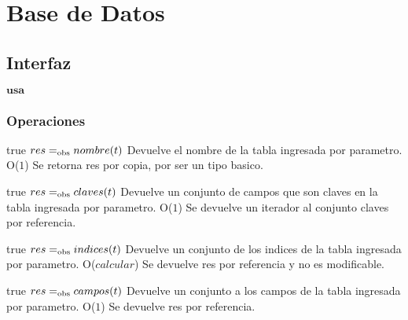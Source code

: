 



\section{Base de Datos}

\subsection{Interfaz}

$\textbf{usa}$  


\subsubsection*{Operaciones}



 {true}
 {$res =_{\mathrm{obs}} nombre(t)$}
 {Devuelve el nombre de la tabla ingresada por parametro.}
 {O($1$)}
 {Se retorna res por copia, por ser un tipo basico.}

 {true}
 {$res =_{\mathrm{obs}} claves(t)$}
 {Devuelve un conjunto de campos que son claves en la tabla ingresada por parametro.}
 {O($1$)}
 {Se devuelve un iterador al conjunto claves por referencia.}
 
 {true}
 {$res =_{\mathrm{obs}} indices(t)$}
 {Devuelve un conjunto de los indices de la tabla ingresada por parametro.}
 {O($calcular$)}
 {Se devuelve res por referencia y no es modificable.}
 
 {true}
 {$res =_{\mathrm{obs}} campos(t)$}
 {Devuelve un conjunto a los campos de la tabla ingresada por parametro.}
 {O($1$)}
 {Se devuelve res por referencia.}


